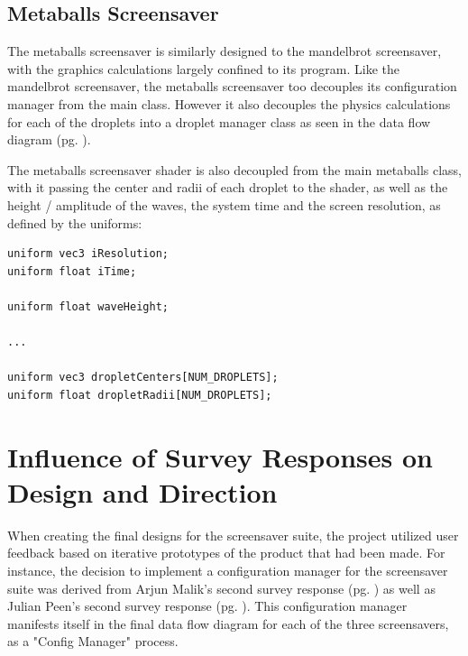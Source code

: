 \documentclass[10pt, openany]{book}
\begin{document}
\subsection{Metaballs Screensaver}
The metaballs screensaver is similarly designed to the mandelbrot screensaver, with the graphics calculations largely confined to its  program. Like the mandelbrot screensaver, the metaballs screensaver too decouples its configuration manager from the main class. However it also decouples the physics calculations for each of the droplets into a droplet manager class as seen in the data flow diagram (pg. \pageref{app:metaballs-dfd}).

The metaballs screensaver shader is also decoupled from the main metaballs class, with it passing the center and radii of each droplet to the shader, as well as the height / amplitude of the waves, the system time and the screen resolution, as defined by the uniforms:

\begin{verbatim}
uniform vec3 iResolution;
uniform float iTime;

uniform float waveHeight;

...

uniform vec3 dropletCenters[NUM_DROPLETS];
uniform float dropletRadii[NUM_DROPLETS];
\end{verbatim}

\section{Influence of Survey Responses on Design and Direction}
When creating the final designs for the screensaver suite, the project utilized user feedback based on iterative prototypes of the product that had been made. For instance, the decision to implement a configuration manager for the screensaver suite was derived from Arjun Malik's second survey response (pg. \pageref{app:survey-arjun-2}) as well as Julian Peen's second survey response (pg. \pageref{app:survey-julian-2}). This configuration manager manifests itself in the final data flow diagram for each of the three screensavers, as a "Config Manager" process.
\end{document}
